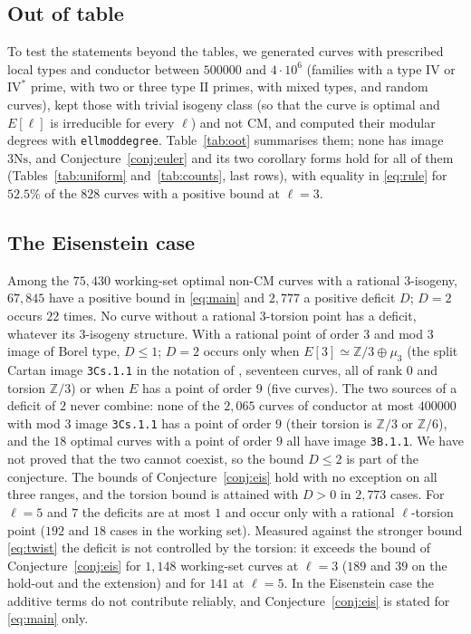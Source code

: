\documentclass[11pt]{amsart}
\theoremstyle{definition}
\newcommand{\Z}{\mathbb{Z}}
\newcommand{\Ns}{3\mathrm{Ns}}
\begin{document}
\subsection{Out of table}\label{sec:oot}
To test the statements beyond the tables, we generated curves with prescribed local types and conductor between $500000$ and $4\cdot10^6$ (families with a type $\mathrm{IV}$ or $\mathrm{IV}^*$ prime, with two or three type $\mathrm{II}$ primes, with mixed types, and random curves), kept those with trivial isogeny class (so that the curve is optimal and $E[\ell]$ is irreducible for every $\ell$) and not CM, and computed their modular degrees with \texttt{ellmoddegree}. Table~\ref{tab:oot} summarises them; none has image $\Ns$, and Conjecture~\ref{conj:euler} and its two corollary forms hold for all of them (Tables~\ref{tab:uniform} and~\ref{tab:counts}, last rows), with equality in \eqref{eq:rule} for $52.5\%$ of the $828$ curves with a positive bound at $\ell=3$.

\begin{table}[ht]
\centering\small

\caption{Curves outside the tables, with modular degrees computed independently.}\label{tab:oot}
\end{table}

\subsection{The Eisenstein case}\label{sec:eis}
Among the $75{,}430$ working-set optimal non-CM curves with a rational $3$-isogeny, $67{,}845$ have a positive bound in \eqref{eq:main} and $2{,}777$ a positive deficit $D$; $D=2$ occurs $22$ times. No curve without a rational $3$-torsion point has a deficit, whatever its $3$-isogeny structure. With a rational point of order $3$ and mod $3$ image of Borel type, $D\le1$; $D=2$ occurs only when $E[3]\simeq\Z/3\oplus\mu_3$ (the split Cartan image \texttt{3Cs.1.1} in the notation of \cite{Sutherland16}, seventeen curves, all of rank $0$ and torsion $\Z/3$) or when $E$ has a point of order $9$ (five curves). The two sources of a deficit of $2$ never combine: none of the $2{,}065$ curves of conductor at most $400000$ with mod $3$ image \texttt{3Cs.1.1} has a point of order $9$ (their torsion is $\Z/3$ or $\Z/6$), and the $18$ optimal curves with a point of order $9$ all have image \texttt{3B.1.1}. We have not proved that the two cannot coexist, so the bound $D\le2$ is part of the conjecture. The bounds of Conjecture~\ref{conj:eis} hold with no exception on all three ranges, and the torsion bound is attained with $D>0$ in $2{,}773$ cases. For $\ell=5$ and $7$ the deficits are at most $1$ and occur only with a rational $\ell$-torsion point ($192$ and $18$ cases in the working set). Measured against the stronger bound \eqref{eq:twist} the deficit is not controlled by the torsion: it exceeds the bound of Conjecture~\ref{conj:eis} for $1{,}148$ working-set curves at $\ell=3$ ($189$ and $39$ on the hold-out and the extension) and for $141$ at $\ell=5$. In the Eisenstein case the additive terms do not contribute reliably, and Conjecture~\ref{conj:eis} is stated for \eqref{eq:main} only.
\end{document}
